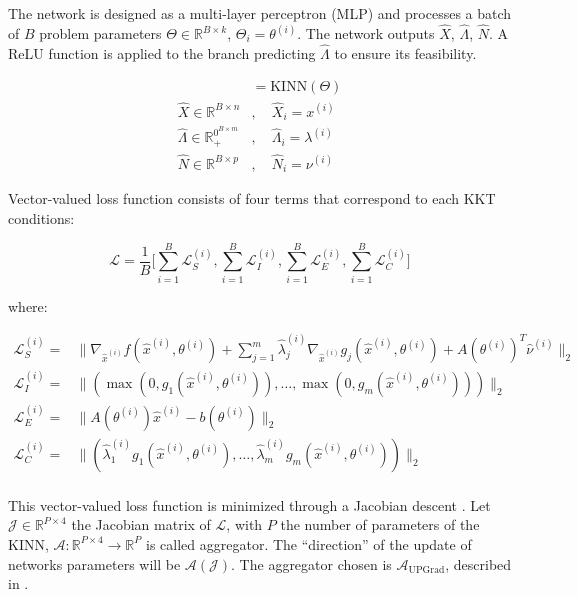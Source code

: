 \documentclass[
]{article}
\begin{document}
The network is designed as a multi-layer perceptron (MLP) and processes
a batch of \(B\) problem parameters
\(\Theta \in \mathbb{R}^{B \times k}\), \(\Theta_i = \theta^{(i)}\). The
network outputs \(\hat{X}\), \(\hat\Lambda\), \(\hat{N}\). A ReLU
function is applied to the branch predicting \(\hat\Lambda\) to ensure
its feasibility.

\begin{align}
[\hat{X}, \hat{\Lambda}, \hat{N}] &= \textrm{KINN}(\Theta)\\
\hat{X} \in \mathbb{R}^{B\times n}&, \quad \hat X_i = x^{(i)}\\
\hat{\Lambda} \in \mathbb{R}^{0^{B\times m}}_+&, \quad \hat\Lambda_i = \lambda^{(i)}\\
\hat{N} \in \mathbb{R}^{B\times p}&, \quad \hat{N}_i = \nu^{(i)}
\end{align}

Vector-valued loss function consists of four terms that correspond to
each KKT conditions:

\begin{equation}
\mathcal{L} = \frac{1}{B}\biggr[\sum_{i=1}^B\mathcal{L}_{S}^{(i)}, \sum_{i=1}^B\mathcal{L}_{I}^{(i)}, \sum_{i=1}^B\mathcal{L}_{E}^{(i)}, \sum_{i=1}^B\mathcal{L}_{C}^{(i)}\biggr] 
\end{equation}

where:

\begin{align}
    \mathcal{L}_{S}^{(i)} =& \|\nabla_{\hat{x}^{(i)}} f(\hat{x}^{(i)}, \theta^{(i)}) + \sum\nolimits_{j=1}^m \hat{\lambda}^{(i)}_j\nabla_{\hat{x}^{(i)}} g_j(\hat{x}^{(i)}, \theta^{(i)}) + A(\theta^{(i)})^T\hat{\nu}^{(i)}\|_2\\ 
    \mathcal{L}_{I}^{(i)}  =& \|(\max(0, g_1(\hat{x}^{(i)}, \theta^{(i)})),\dots,\max(0, g_m(\hat{x}^{(i)}, \theta^{(i)})))\|_2\\
    \mathcal{L}_{E}^{(i)} =& \|A(\theta^{(i)}) \hat{x}^{(i)} - b(\theta^{(i)})\|_2\\
    \mathcal{L}_{C}^{(i)}  =& \|(\hat{\lambda}_1^{(i)} g_1(\hat{x}^{(i)}, \theta^{(i)}),\dots,\hat{\lambda}_m^{(i)} g_m(\hat{x}^{(i)}, \theta^{(i)}))\|_2\\
\end{align}

This vector-valued loss function is minimized through a Jacobian descent
\autocite{quintonJacobianDescentMultiObjective2024a}. Let
\(\mathcal{J} \in \mathbb{R}^{P\times4}\) the Jacobian matrix of
\(\mathcal{L}\), with \(P\) the number of parameters of the KINN,
\(\mathcal{A}: \mathbb{R}^{P\times4} \to \mathbb{R}^{P}\) is called
aggregator. The ``direction'' of the update of networks parameters will
be \(\mathcal{A}(\mathcal{J})\). The aggregator chosen is
\(\mathcal{A}_{\mathrm{UPGrad}}\), described in
\autocite{quintonJacobianDescentMultiObjective2024a}.
\end{document}
